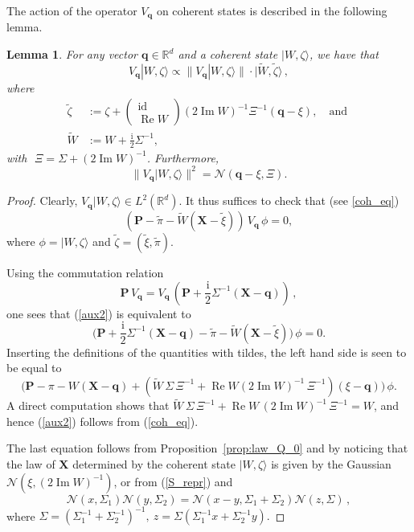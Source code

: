 \documentclass[12pt]{article}
\newtheorem{lemma}[theorem]{Lemma}
\newcommand{\ket}[1]{|{#1}\rangle}
\renewcommand{\Re}{\operatorname{Re}}
\renewcommand{\Im}{\operatorname{Im}}
\renewcommand\i{\mathrm{i}}
\newcommand{\iu}{{\mathrm i}}
\newcommand{\id}{\mathrm{id}}
\begin{document}
The action of the operator $V_{\mathbf q}$ on coherent states is described in the following lemma.
\begin{lemma}
\label{qLemma}
For any vector $\mathbf q\in\mathbb R^d$ and a coherent state $\ket{W, \zeta}$, we have that
$$V_{\mathbf q} \ket{W, \zeta} \propto \|V_{\mathbf q} \ket{W, \zeta}\| \cdot \ket{\tilde{W}, \tilde{\zeta}}\,,$$ 
where
\begin{align*}
\tilde{\zeta}& :=  \zeta + \left(\begin{array}{c} \id \\ \Re W  \end{array} \right) (2\Im W)^{-1} \Xi^{-1}(\mathbf q-\xi), \quad \text{and }\\
 \tilde{W} &:= W + \frac{\iu}{2}\Sigma^{-1},
\end{align*}
with\,\, $\Xi = \Sigma + (2 \Im W)^{-1}$. Furthermore,
$$
\|V_{\mathbf q} \ket{W, \zeta}\|^2 = \mathcal{N}(\mathbf q - \xi, \Xi).
$$
\end{lemma}
\begin{proof}
Clearly, $V_{\mathbf q} \ket{W, \zeta} \in L^2(\mathbb R^d)$. It thus suffices to check  that (see \eqref{coh_eq})
\begin{equation}
\label{aux2}
(\mathbf P - \tilde{\pi} - \tilde{W}(\mathbf X - \tilde{\xi})) \, V_{\mathbf q}\, \phi = 0,
\end{equation}
where $\phi=\ket{ W, \zeta}$ and $\tilde\zeta=(\tilde\xi,\tilde\pi)$.

Using the commutation relation $$\mathbf P\, V_{\mathbf q} = V_{\mathbf q}\, (\mathbf P + \frac{\i}{2}\Sigma^{-1}(\mathbf X - \mathbf q))\,,$$ 
one sees that (\ref{aux2}) is equivalent to 
$$
\Big(\mathbf P + \frac{\i}{2}\Sigma^{-1}(\mathbf X -\mathbf q) - \tilde{\pi} - \tilde{W} (\mathbf X - \tilde{\xi})\Big)\, \phi =  0.
$$
Inserting the definitions of the quantities with tildes, the left hand side is seen to be equal to
$$
\Big(\mathbf P - \pi - W(\mathbf X- \mathbf q) + (\tilde{W}\, \Sigma\,\Xi^{-1}+ \Re W(2\Im W)^{-1}\,\Xi^{-1}) (\xi - \mathbf q)\Big) \,\phi.
$$
A direct computation shows that $ \tilde{W}\, \Sigma\, \Xi^{-1}+ \Re W\,(2\Im W)^{-1}\,\Xi^{-1} = W$, and hence (\ref{aux2}) follows from (\ref{coh_eq}).

The last equation follows from Proposition~\ref{prop:law_Q_0} and by noticing that the law of $\mathbf X$ determined by the coherent state $\ket{W,\zeta}$ is given by the Gaussian $\mathcal N(\xi,(2\Im W)^{-1})$, or from (\ref{S_repr}) and 
\begin{equation*}
\mathcal{N}(x, \Sigma_1) \mathcal{N}(y, \Sigma_2) = \mathcal{N}(x-y, \Sigma_1 + \Sigma_2) \mathcal{N}(z, \Sigma)\,,
\end{equation*}
where 
$
\Sigma = (\Sigma_1^{-1} + \Sigma_2^{-1})^{-1},\ z = \Sigma (\Sigma_1^{-1} x + \Sigma_2^{-1}y).
$
\end{proof}
\end{document}
